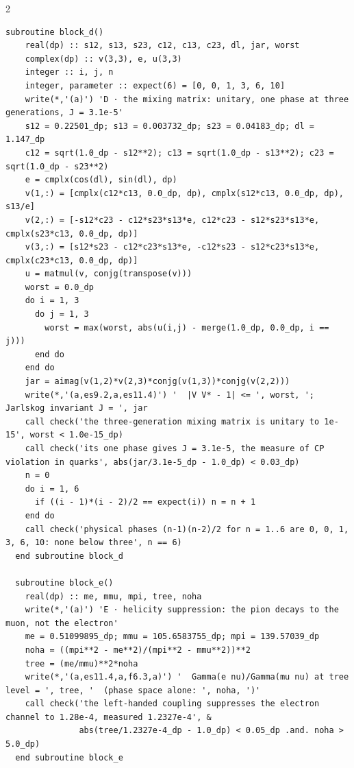 \documentclass[10pt]{article}
\begin{document}
\begin{multicols}{2}
\begin{Verbatim}[fontsize=\fontsize{6.2}{7.2}\selectfont,breaklines,breakanywhere,breaksymbolleft={}]
  subroutine block_d()
    real(dp) :: s12, s13, s23, c12, c13, c23, dl, jar, worst
    complex(dp) :: v(3,3), e, u(3,3)
    integer :: i, j, n
    integer, parameter :: expect(6) = [0, 0, 1, 3, 6, 10]
    write(*,'(a)') 'D · the mixing matrix: unitary, one phase at three generations, J = 3.1e-5'
    s12 = 0.22501_dp; s13 = 0.003732_dp; s23 = 0.04183_dp; dl = 1.147_dp
    c12 = sqrt(1.0_dp - s12**2); c13 = sqrt(1.0_dp - s13**2); c23 = sqrt(1.0_dp - s23**2)
    e = cmplx(cos(dl), sin(dl), dp)
    v(1,:) = [cmplx(c12*c13, 0.0_dp, dp), cmplx(s12*c13, 0.0_dp, dp), s13/e]
    v(2,:) = [-s12*c23 - c12*s23*s13*e, c12*c23 - s12*s23*s13*e, cmplx(s23*c13, 0.0_dp, dp)]
    v(3,:) = [s12*s23 - c12*c23*s13*e, -c12*s23 - s12*c23*s13*e, cmplx(c23*c13, 0.0_dp, dp)]
    u = matmul(v, conjg(transpose(v)))
    worst = 0.0_dp
    do i = 1, 3
      do j = 1, 3
        worst = max(worst, abs(u(i,j) - merge(1.0_dp, 0.0_dp, i == j)))
      end do
    end do
    jar = aimag(v(1,2)*v(2,3)*conjg(v(1,3))*conjg(v(2,2)))
    write(*,'(a,es9.2,a,es11.4)') '  |V V* - 1| <= ', worst, ';  Jarlskog invariant J = ', jar
    call check('the three-generation mixing matrix is unitary to 1e-15', worst < 1.0e-15_dp)
    call check('its one phase gives J = 3.1e-5, the measure of CP violation in quarks', abs(jar/3.1e-5_dp - 1.0_dp) < 0.03_dp)
    n = 0
    do i = 1, 6
      if ((i - 1)*(i - 2)/2 == expect(i)) n = n + 1
    end do
    call check('physical phases (n-1)(n-2)/2 for n = 1..6 are 0, 0, 1, 3, 6, 10: none below three', n == 6)
  end subroutine block_d

  subroutine block_e()
    real(dp) :: me, mmu, mpi, tree, noha
    write(*,'(a)') 'E · helicity suppression: the pion decays to the muon, not the electron'
    me = 0.51099895_dp; mmu = 105.6583755_dp; mpi = 139.57039_dp
    noha = ((mpi**2 - me**2)/(mpi**2 - mmu**2))**2
    tree = (me/mmu)**2*noha
    write(*,'(a,es11.4,a,f6.3,a)') '  Gamma(e nu)/Gamma(mu nu) at tree level = ', tree, '  (phase space alone: ', noha, ')'
    call check('the left-handed coupling suppresses the electron channel to 1.28e-4, measured 1.2327e-4', &
               abs(tree/1.2327e-4_dp - 1.0_dp) < 0.05_dp .and. noha > 5.0_dp)
  end subroutine block_e


\end{Verbatim}
\end{multicols}
\end{document}
